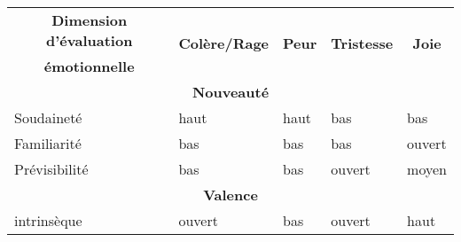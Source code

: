 \begin{table}[]
\begin{tabular}{|l|l|l|l|l|}
\hline
\multicolumn{1}{|c|}{\textbf{Dimension d’évaluation}} & \multicolumn{1}{c|}{\multirow{2}{*}{\textbf{Colère/Rage}}} & \multicolumn{1}{c|}{\multirow{2}{*}{\textbf{Peur}}} & \multicolumn{1}{c|}{\multirow{2}{*}{\textbf{Tristesse}}} & \multicolumn{1}{c|}{\multirow{2}{*}{\textbf{Joie}}} \\
\multicolumn{1}{|c|}{\textbf{émotionnelle}}           & \multicolumn{1}{c|}{}                                      & \multicolumn{1}{c|}{}                               & \multicolumn{1}{c|}{}                                    & \multicolumn{1}{c|}{}                               \\ \hline
\multicolumn{5}{|c|}{\textbf{Nouveauté}}                                                                                                                                                                                                                                                  \\ \hline
Soudaineté                                            & haut                                                       & haut                                                & bas                                                      & bas                                                 \\ \hline
Familiarité                                           & bas                                                        & bas                                                 & bas                                                      & ouvert                                              \\ \hline
Prévisibilité                                         & bas                                                        & bas                                                 & ouvert                                                   & moyen                                               \\ \hline
\multicolumn{5}{|c|}{\textbf{Valence}}                                                                                                                                                                                                                                                    \\ \hline
intrinsèque                                           & ouvert                                                     & bas                                                 & ouvert                                                   & haut                                                \\ \hline

\end{tabular}
\end{table}
